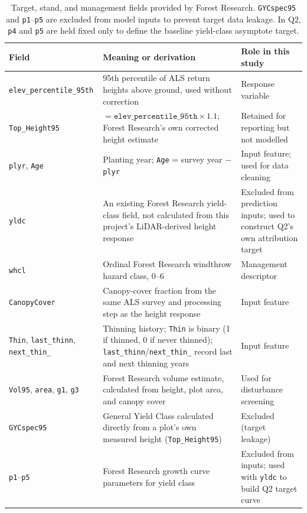 \documentclass[logo,msc,ai]{infthesis}           %
\begin{document}
\begin{table}[!htbp]
\centering
\scriptsize
\setlength{\tabcolsep}{3pt}
\renewcommand{\arraystretch}{0.95}
\begin{tabular}{
    >{\raggedright\arraybackslash}p{2.6cm}
    >{\raggedright\arraybackslash}p{7.0cm}
    >{\raggedright\arraybackslash}p{3.2cm}
}
\hline
Field & Meaning or derivation & Role in this study \\
\hline
\texttt{elev\_\allowbreak percentile\_\allowbreak 95th} & 95th percentile of ALS return heights above ground, used without correction & Response variable \\
\texttt{Top\_Height95} & $=\texttt{elev\_percentile\_95th}\times1.1$; Forest Research's own corrected height estimate & Retained for reporting but not modelled \\
\texttt{plyr}, \texttt{Age} & Planting year; \texttt{Age} = survey year $-$ \texttt{plyr} & Input feature; used for data cleaning \\
\texttt{yldc} & An existing Forest Research yield-class field, not calculated from this project's LiDAR-derived height response & Excluded from prediction inputs; used to construct Q2's own attribution target \\
\texttt{whcl} & Ordinal Forest Research windthrow hazard class, 0--6 & Management descriptor \\
\texttt{CanopyCover} & Canopy-cover fraction from the same ALS survey and processing step as the height response & Input feature \\
\texttt{Thin}, \texttt{last\_thinn}, \texttt{next\_thin\_} & Thinning history; \texttt{Thin} is binary (1 if thinned, 0 if never thinned); \texttt{last\_thinn}/\texttt{next\_thin\_} record last and next thinning years & Input feature \\
\texttt{Vol95}, \texttt{area}, \texttt{g1}, \texttt{g3} & Forest Research volume estimate, calculated from height, plot area, and canopy cover & Used for disturbance screening \\
\texttt{GYCspec95} & General Yield Class calculated directly from a plot's own measured height (\texttt{Top\_Height95}) & Excluded (target leakage) \\
\texttt{p1}--\texttt{p5} & Forest Research growth curve parameters for yield class & Excluded from inputs; used with \texttt{yldc} to build Q2 target curve \\
\hline
\end{tabular}
\caption{\small{Target, stand, and management fields provided by Forest Research. \texttt{GYCspec95} and \texttt{p1}--\texttt{p5} are excluded from model inputs to prevent target data leakage. In Q2, \texttt{p4} and \texttt{p5} are held fixed only to define the baseline yield-class asymptote target.}}
\label{tab:data-fields}
\end{table}
\end{document}
